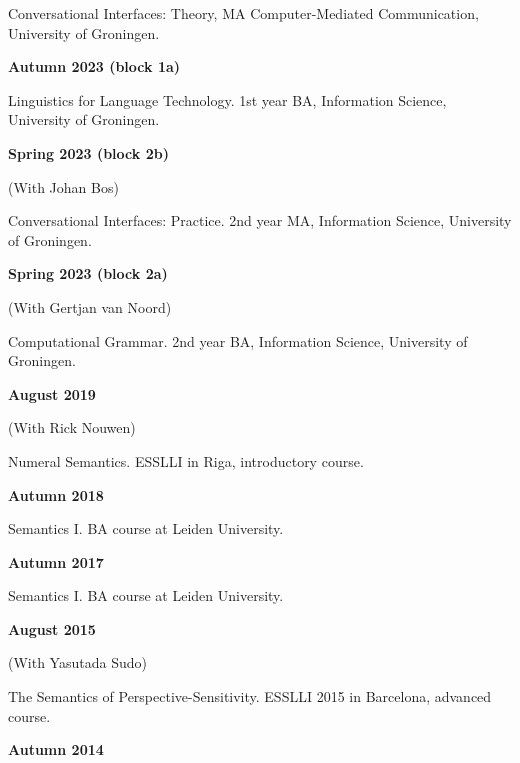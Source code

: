 \documentclass[12pt,letterpaper]{article}
\begin{document}
{{Conversational Interfaces: Theory, MA Computer-Mediated Communication, University of Groningen.
}

\vspace{2mm}

\small{
\noindent\textbf{Autumn 2023 (block 1a)} 

Linguistics for Language Technology. 1st year BA, Information Science, University of Groningen.
}

\vspace{2mm}

\small{
\noindent\textbf{Spring 2023 (block 2b)} 

(With Johan Bos)

Conversational Interfaces: Practice. 2nd year MA, Information Science, University of Groningen.
}

\vspace{2mm}

\small{
\noindent\textbf{Spring 2023 (block 2a)} 

(With Gertjan van Noord)

Computational Grammar. 2nd year BA, Information Science, University of Groningen.
}

\vspace{2mm}

\small{
\noindent\textbf{August 2019} 

(With Rick Nouwen)

Numeral Semantics. ESSLLI in Riga, introductory course.
}

\vspace{2mm}

\small{
\noindent\textbf{Autumn 2018}

Semantics I. BA course at Leiden University.
}

\vspace{2mm}

\small{
\noindent\textbf{Autumn 2017}

Semantics I. BA course at Leiden University.
}

\vspace{2mm}

\small{
\noindent\textbf{August 2015}

(With Yasutada Sudo)

The Semantics of Perspective-Sensitivity. ESSLLI 2015 in Barcelona, advanced course.
}

\vspace{2mm}

\small{
\noindent\textbf{Autumn 2014}

}}
\end{document}
